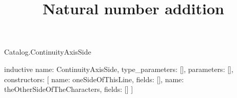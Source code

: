 \begin{lexlean}{Catalog.ContinuityAxisSide}
\title{Natural number addition}
\begin{semanticmodule}
inductive{
  name: ContinuityAxisSide,
  type_parameters: [],
  parameters: [],
  constructors: [
    {name: oneSideOfThisLine, fields: []},
    {name: theOtherSideOfTheCharacters, fields: []}
  ]
}
\end{semanticmodule}
\end{lexlean}
